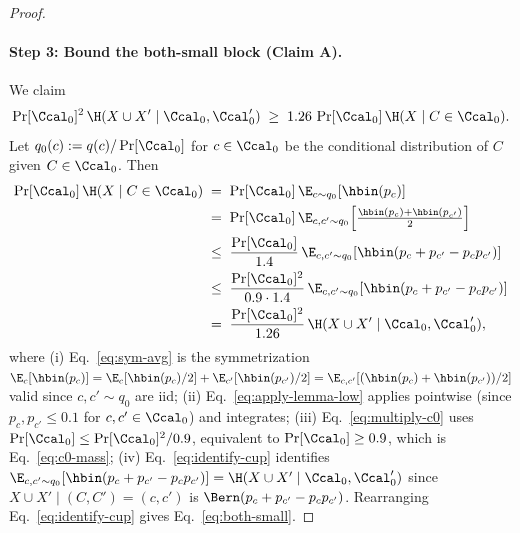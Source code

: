 \begin{proof}
\paragraph{Step 3: Bound the both-small block (Claim A).}
We claim
\begin{align}\label{eq:both-small}
\Pr[\Ccal_0]^2 \, \H(X \cup X' \mid \Ccal_0, \Ccal_0')
\;\ge\; 1.26 \, \Pr[\Ccal_0] \, \H(X \mid C \in \Ccal_0).
\end{align}
Let $q_0(c) := q(c) / \Pr[\Ccal_0]$ for $c \in \Ccal_0$ be the conditional
distribution of $C$ given $C \in \Ccal_0$. Then
\begin{align}
\Pr[\Ccal_0] \, \H(X \mid C \in \Ccal_0)
&\;=\; \Pr[\Ccal_0] \, \E_{c \sim q_0}[\hbin(p_c)] \notag \\
&\;=\; \Pr[\Ccal_0] \, \E_{c, c' \sim q_0} \!\left[ \tfrac{\hbin(p_c) + \hbin(p_{c'})}{2} \right] \label{eq:sym-avg}\\
&\;\le\; \frac{\Pr[\Ccal_0]}{1.4} \, \E_{c, c' \sim q_0} \!\left[ \hbin(p_c + p_{c'} - p_c p_{c'}) \right] \label{eq:apply-lemma-low}\\
&\;\le\; \frac{\Pr[\Ccal_0]^2}{0.9 \cdot 1.4} \, \E_{c, c' \sim q_0} \!\left[ \hbin(p_c + p_{c'} - p_c p_{c'}) \right] \label{eq:multiply-c0}\\
&\;=\; \frac{\Pr[\Ccal_0]^2}{1.26} \, \H(X \cup X' \mid \Ccal_0, \Ccal_0'), \label{eq:identify-cup}
\end{align}
where (i) Eq.~\eqref{eq:sym-avg} is the symmetrization
$\E_c[\hbin(p_c)] = \E_c[\hbin(p_c)/2] + \E_{c'}[\hbin(p_{c'})/2]
= \E_{c,c'}[(\hbin(p_c) + \hbin(p_{c'}))/2]$ valid since $c, c' \sim q_0$ are iid;
(ii) Eq.~\eqref{eq:apply-lemma-low} applies  pointwise
(since $p_c, p_{c'} \le 0.1$ for $c, c' \in \Ccal_0$) and integrates;
(iii) Eq.~\eqref{eq:multiply-c0} uses
$\Pr[\Ccal_0] \le \Pr[\Ccal_0]^2 / 0.9$, equivalent to
$\Pr[\Ccal_0] \ge 0.9$, which is Eq.~\eqref{eq:c0-mass};
(iv) Eq.~\eqref{eq:identify-cup} identifies
$\E_{c, c' \sim q_0}[\hbin(p_c + p_{c'} - p_c p_{c'})] = \H(X \cup X' \mid \Ccal_0, \Ccal_0')$
since $X \cup X' \mid (C, C') = (c, c')$ is $\Bern(p_c + p_{c'} - p_c p_{c'})$.
Rearranging Eq.~\eqref{eq:identify-cup} gives Eq.~\eqref{eq:both-small}.


\end{proof}
